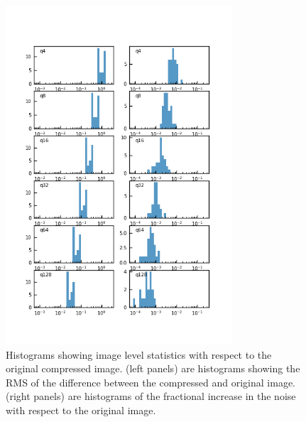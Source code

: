 \begin{figure}
\centering
\includegraphics[width=0.75\textwidth]{figure/compression_metric_v2.png}
\caption{Histograms showing image level statistics with respect to the original compressed image.
(left panels) are histograms showing the RMS of the difference between the compressed and original image. 
(right panels) are histograms of the fractional increase in the noise with respect to the original image.}
\label{image_difference}
\end{figure}

